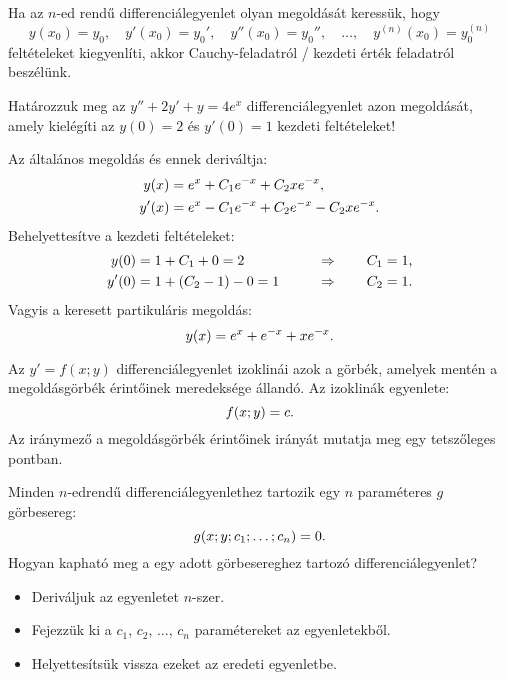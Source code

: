 \documentclass{szb-practice}
\begin{document}
\begin{definition}
  Ha az $n$-ed rendű differenciálegyenlet olyan megoldását keressük, hogy
  $$
    y(x_0) = y_0, \quad
    y'(x_0) = y_0', \quad
    y''(x_0) = y_0'', \quad
    \dots, \quad
    y^{(n)}(x_0) = y_0^{(n)}
  $$
  feltételeket kiegyenlíti, akkor Cauchy-feladatról / kezdeti érték feladatról
  beszélünk.
\end{definition}

\begin{example}
  Határozzuk meg az $y'' + 2y' + y = 4e^x$ differenciálegyenlet azon megoldását,
  amely kielégíti az $y(0) = 2$ és $y'(0) = 1$ kezdeti feltételeket!

  Az általános megoldás és ennek deriváltja:
  $$
    \begin{aligned}
      y(x)  & = e^x + C_1 e^{-x} + C_2 x e^{-x} \text,
      \\
      y'(x) & = e^x - C_1 e^{-x} + C_2 e^{-x} - C_2 x e^{-x} \text.
    \end{aligned}
  $$
  Behelyettesítve a kezdeti feltételeket:
  $$
    \begin{aligned}
      y(0)  & = 1 + C_1 + 0 = 2
            & \qquad \Rightarrow \qquad C_1 = 1 \text,
      \\
      y'(0) & = 1 + (C_2 - 1) - 0 = 1
            & \qquad \Rightarrow \qquad C_2 = 1 \text.
    \end{aligned}
  $$
  Vagyis a keresett partikuláris megoldás:
  $$
    y(x) = e^x + e^{-x} + x e^{-x}
    \text.
  $$
\end{example}

\begin{blueBox}
  Az $y' = f(x; y)$ differenciálegyenlet izoklinái azok a görbék, amelyek
  mentén a megoldásgörbék érintőinek meredeksége állandó. Az izoklinák
  egyenlete:
  $$
    f(x; y) = c
    \text.
  $$
  Az iránymező a megoldásgörbék érintőinek irányát mutatja meg egy tetszőleges
  pontban.
\end{blueBox}

\begin{blueBox}
  Minden $n$-edrendű differenciálegyenlethez tartozik egy $n$ paraméteres $g$
  görbesereg:
  $$
    g(x; y; c_1; \dots; c_n) = 0
    \text.
  $$
  Hogyan kapható meg a egy adott görbesereghez tartozó differenciálegyenlet?
  \begin{itemize}
    \item Deriváljuk az egyenletet $n$-szer.
    \item Fejezzük ki a $c_1$, $c_2$, $\dots$, $c_n$ paramétereket az
          egyenletekből.
    \item Helyettesítsük vissza ezeket az eredeti egyenletbe.
  \end{itemize}
\end{blueBox}
\end{document}
